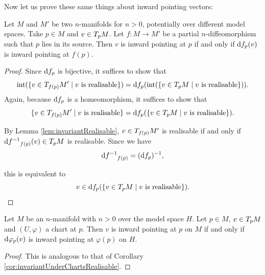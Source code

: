 Now let us prove these same things about inward pointing vectors: 

\begin{lem}
Let $M$ and $M'$ be two $n$-manifolds for $n > 0$, potentially over different model spaces. 
Take $p \in M$ and $v \in T_{p}M$. 
Let $f \colon M \to M'$ be a partial $n$-diffeomorphism such that $p$ lies in its source.
Then $v$ is inward pointing at $p$ if and only if $\text{d}{f}_{p}(v)$ is inward pointing at $f (p)$.
\end{lem}

\begin{proof}
Since $\text{d}{f}_{p}$ is bijective, it suffices to show that 
\begin{equation*}
\text{int}(\{v \in T_{f(p)}M' \mid v \text{ is realisable}\}) = 
\text{d}{f}_{p}(\text{int}(\{v \in T_{p}M \mid v \text{ is realisable} \})). 
\end{equation*}
Again, because $\text{d}{f}_{p}$ is a homeomorphism, it suffices to show that 
\begin{equation*}
\{v \in T_{f(p)}M' \mid v \text{ is realisable}\} = 
\text{d}{f}_{p}(\{v \in T_{p}M \mid v \text{ is realisable} \}). 
\end{equation*}

By Lemma \ref{lem:invariantRealisable}, $v \in T_{f(p)}M'$ is realisable if and only if $\text{d}{f^{-1}}_{f(p)}(v) \in T_{p}M$ is realisable. 
Since we have
\begin{equation*}
\text{d}{f^{-1}}_{f(p)} = (\text{d}{f}_{p})^{-1},
\end{equation*}

this is equivalent to 
\begin{equation*}
v \in \text{d}{f}_{p}(\{v \in T_{p}M \mid v \text{ is realisable} \}).
\end{equation*}
\end{proof}

\begin{cor}
Let $M$ be an $n$-manifold with $n > 0$ over the model space $H$. Let $p \in M$, $v \in T_{p}M$ and $(U, \varphi)$ a chart at $p$. 
Then $v$ is inward pointing at $p$ on $M$ if and only if $\text{d}{\varphi}_{p}(v)$ is inward pointing at $\varphi(p)$ on $H$. 
\end{cor}

\begin{proof}
This is analogous to that of Corollary \ref{cor:invariantUnderChartsRealisable}.
\end{proof}

